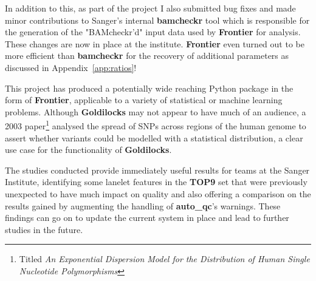 In addition to this, as part of the project I also submitted bug fixes and
made minor contributions to Sanger's internal \textbf{bamcheckr} tool which is
responsible for the generation of the "BAMcheckr'd" input data used by
\textbf{Frontier} for analysis. These changes are now in place
at the institute. \textbf{Frontier} even turned out to be more efficient than
\textbf{bamcheckr} for the recovery of additional parameters as discussed in
Appendix~\ref{app:ratios}!

This project has produced a potentially wide reaching Python package in
the form of \textbf{Frontier}, applicable to a variety of statistical or machine
learning problems. Although \textbf{Goldilocks} may not appear to have much of
an audience, a 2003 paper\citep{kendal2003exponential}\footnote{Titled \textit{An Exponential
Dispersion Model for the Distribution of Human Single Nucleotide
Polymorphisms}\citep{kendal2003exponential}} analysed the spread of SNPs
across regions of the human genome to assert whether variants could be modelled
with a statistical distribution, a clear use case for the functionality of
\textbf{Goldilocks}.

The studies conducted provide immediately useful results for
teams at the Sanger Institute, identifying some lanelet features in the
\textbf{TOP9} set that were previously unexpected to have much impact on
quality and also offering a comparison on the results gained by augmenting the handling
of \textbf{auto\_qc}'s warnings. These findings can go on to update the current
system in place and lead to further studies in the future.
